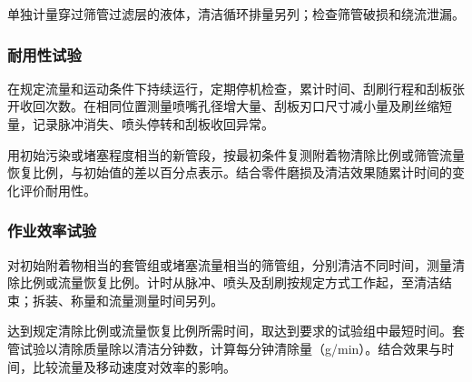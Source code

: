 单独计量穿过筛管过滤层的液体，清洁循环排量另列；检查筛管破损和绕流泄漏。

\subsubsection{耐用性试验}
在规定流量和运动条件下持续运行，定期停机检查，累计时间、刮刷行程和刮板张开收回次数。在相同位置测量喷嘴孔径增大量、刮板刃口尺寸减小量及刷丝缩短量，记录脉冲消失、喷头停转和刮板收回异常。

用初始污染或堵塞程度相当的新管段，按最初条件复测附着物清除比例或筛管流量恢复比例，与初始值的差以百分点表示。结合零件磨损及清洁效果随累计时间的变化评价耐用性。

\subsubsection{作业效率试验}
对初始附着物相当的套管组或堵塞流量相当的筛管组，分别清洁不同时间，测量清除比例或流量恢复比例。计时从脉冲、喷头及刮刷按规定方式工作起，至清洁结束；拆装、称量和流量测量时间另列。

达到规定清除比例或流量恢复比例所需时间，取达到要求的试验组中最短时间。套管试验以清除质量除以清洁分钟数，计算每分钟清除量（g/min）。结合效果与时间，比较流量及移动速度对效率的影响。
